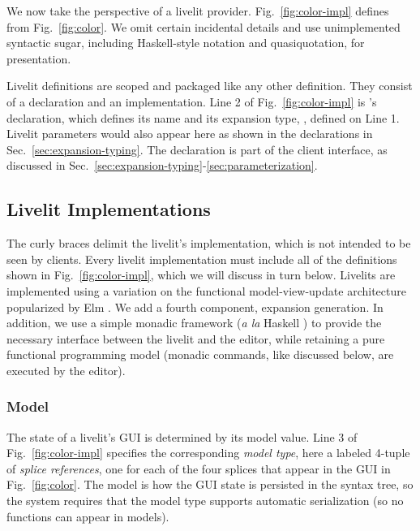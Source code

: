 \noindent
We now take the perspective of a livelit provider.
Fig.~\ref{fig:color-impl}
defines  from Fig.~\ref{fig:color}. We omit certain 
incidental details and use unimplemented syntactic sugar, including
Haskell-style  notation and quasiquotation, for presentation.

Livelit definitions are scoped and packaged like 
any other definition. They consist of a declaration and an implementation. 
Line 2 of Fig.~\ref{fig:color-impl} is 's declaration,
which defines its name and its {expansion type}, , defined on Line 1. 
Livelit parameters would also appear here as shown in the declarations in Sec.~\ref{sec:expansion-typing}. 
The declaration is part of the client interface, 
as discussed in Sec.~\ref{sec:expansion-typing}-\ref{sec:parameterization}. 

\subsection{Livelit Implementations}
The curly braces delimit the livelit's implementation, which is not intended to be seen 
by clients. 
Every livelit implementation must include all of the definitions shown in Fig.~\ref{fig:color-impl}, 
which we will discuss in turn below. 
Livelits are implemented using a variation on the functional model-view-update
architecture popularized by Elm \cite{ElmArchitecture}. We add a fourth component,
expansion generation. In addition, we use a simple monadic framework (\emph{a la} Haskell \cite{marlow2010haskell}) to provide the necessary  
interface between the livelit and the editor, while retaining
a pure functional programming model (monadic commands, like  discussed below, are executed by the editor).

\subsubsection{Model}\label{sec:model}
The state of a livelit's GUI is determined by its model value. 
Line 3 of Fig.~\ref{fig:color-impl} specifies the corresponding \emph{model type},
here a labeled 4-tuple of \emph{splice references}, one for each of the four splices
that appear in the GUI in Fig.~\ref{fig:color}.
The model is how the GUI state is persisted in the syntax tree, so 
 the system requires that the model type supports automatic serialization
 (so no functions can appear in models).

